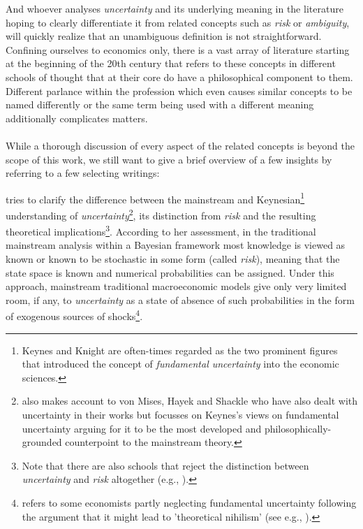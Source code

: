 \documentclass[a4paper,11pt,listof=nochaptergap,oneside,pointednumbers,bibtotoc,bigheadings,liststotoc,hidelinks]{scrbook}
\theoremstyle{mysatz}
\theoremstyle{mydefinition}
\theoremstyle{mytheorem}
\theoremstyle{mybemerkung}
\begin{document}
And whoever analyses \textit{uncertainty} and its underlying meaning in the literature hoping to clearly differentiate it from related concepts such as \textit{risk} or \textit{ambiguity}, will quickly realize that an unambiguous definition is not straightforward. Confining ourselves to economics only, there is a vast array of literature starting at the beginning of the 20th century that refers to these concepts in different schools of thought that at their core do have a philosophical component to them. Different parlance within the profession which even causes similar concepts to be named differently \citep{dow:16} or the same term being used with a different meaning additionally complicates matters.\\
\\
While a thorough discussion of every aspect of the related concepts is beyond the scope of this work, we still want to give a brief overview of a few insights by referring to a few selecting writings:

\citet{dow:16} tries to clarify the difference between the mainstream and Keynesian\footnote{Keynes and Knight are often-times regarded as the two prominent figures that introduced the concept of \textit{fundamental uncertainty} into the economic sciences.} understanding of \textit{uncertainty}\footnote{\citet{dow:16} also makes account to von Mises, Hayek and Shackle who have also dealt with uncertainty in their works but focusses on Keynes's views on fundamental uncertainty arguing for it to be the most developed and philosophically-grounded counterpoint to the mainstream theory.}, its distinction from \textit{risk} and the resulting theoretical implications\footnote{Note that there are also schools that reject the distinction between \textit{uncertainty} and \textit{risk} altogether (e.g., \citealp{savage:54}).}. According to her assessment, in the traditional mainstream analysis within a Bayesian framework most knowledge is viewed as known or known to be stochastic in some form (called \textit{risk}), meaning that the state space is known and numerical probabilities can be assigned. Under this approach, mainstream traditional macroeconomic models give only very limited room, if any, to \textit{uncertainty} as a state of absence of such probabilities in the form of exogenous sources of shocks\footnote{\citet[p. 43]{dequesh:00} refers to some economists partly neglecting fundamental uncertainty following the argument that it might lead to 'theoretical nihilism' (see e.g., \citealp{coddington:82}).}.
\end{document}
